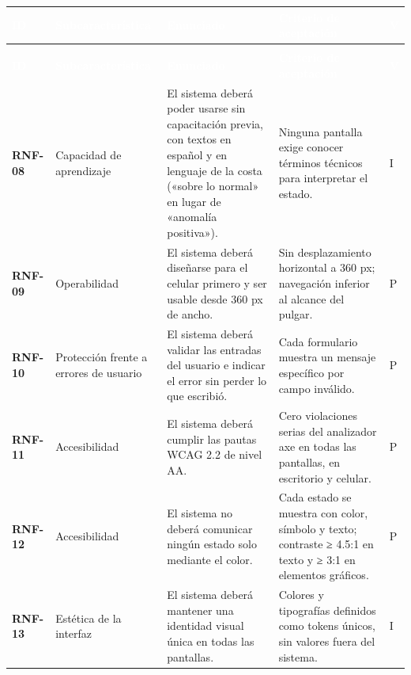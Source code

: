 \documentclass[11pt,a4paper,oneside]{article}
\begin{document}
{\footnotesize
\begin{xltabular}{\textwidth}{@{}>{\sffamily\bfseries}p{1.45cm}>{\raggedright\arraybackslash}p{2.4cm}YY>{\raggedright\arraybackslash}p{0.45cm}@{}}
\textcolor{white}{\sffamily\bfseries\footnotesize ID} & \textcolor{white}{\sffamily\bfseries\footnotesize Subcaracterística} & \textcolor{white}{\sffamily\bfseries\footnotesize Enunciado} & \textcolor{white}{\sffamily\bfseries\footnotesize Criterio de aceptación} & \textcolor{white}{\sffamily\bfseries\footnotesize V}\\
\endfirsthead
{}\\
\textcolor{white}{\sffamily\bfseries\footnotesize ID} & \textcolor{white}{\sffamily\bfseries\footnotesize Subcaracterística} & \textcolor{white}{\sffamily\bfseries\footnotesize Enunciado} & \textcolor{white}{\sffamily\bfseries\footnotesize Criterio de aceptación} & \textcolor{white}{\sffamily\bfseries\footnotesize V}\\
\endhead
RNF-08 & Capacidad de aprendizaje & El sistema deberá poder usarse sin capacitación previa, con textos en español y en lenguaje de la costa («sobre lo normal» en lugar de «anomalía positiva»). & Ninguna pantalla exige conocer términos técnicos para interpretar el estado. & I\\ \hline
{}RNF-09 & Operabilidad & El sistema deberá diseñarse para el celular primero y ser usable desde 360 px de ancho. & Sin desplazamiento horizontal a 360 px; navegación inferior al alcance del pulgar. & P\\ \hline
RNF-10 & Protección frente a errores de usuario & El sistema deberá validar las entradas del usuario e indicar el error sin perder lo que escribió. & Cada formulario muestra un mensaje específico por campo inválido. & P\\ \hline
{}RNF-11 & Accesibilidad & El sistema deberá cumplir las pautas WCAG 2.2 de nivel AA. & Cero violaciones serias del analizador axe en todas las pantallas, en escritorio y celular. & P\\ \hline
RNF-12 & Accesibilidad & El sistema no deberá comunicar ningún estado solo mediante el color. & Cada estado se muestra con color, símbolo y texto; contraste ≥ 4.5:1 en texto y ≥ 3:1 en elementos gráficos. & P\\ \hline
{}RNF-13 & Estética de la interfaz & El sistema deberá mantener una identidad visual única en todas las pantallas. & Colores y tipografías definidos como tokens únicos, sin valores fuera del sistema. & I\\ \hline
\end{xltabular}}
\vspace{0.6em}
\end{document}
